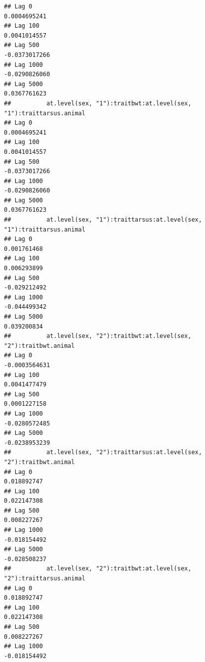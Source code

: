 \documentclass[
  12pt,
]{book}
\begin{document}
\begin{verbatim}
## Lag 0                                                         0.0004695241
## Lag 100                                                       0.0041014557
## Lag 500                                                      -0.0373017266
## Lag 1000                                                     -0.0290826060
## Lag 5000                                                      0.0367761623
##          at.level(sex, "1"):traitbwt:at.level(sex, "1"):traittarsus.animal
## Lag 0                                                         0.0004695241
## Lag 100                                                       0.0041014557
## Lag 500                                                      -0.0373017266
## Lag 1000                                                     -0.0290826060
## Lag 5000                                                      0.0367761623
##          at.level(sex, "1"):traittarsus:at.level(sex, "1"):traittarsus.animal
## Lag 0                                                             0.001761468
## Lag 100                                                           0.006293899
## Lag 500                                                          -0.029212492
## Lag 1000                                                         -0.044499342
## Lag 5000                                                          0.039200834
##          at.level(sex, "2"):traitbwt:at.level(sex, "2"):traitbwt.animal
## Lag 0                                                     -0.0003564631
## Lag 100                                                    0.0041477479
## Lag 500                                                    0.0001227158
## Lag 1000                                                  -0.0280572485
## Lag 5000                                                  -0.0238953239
##          at.level(sex, "2"):traittarsus:at.level(sex, "2"):traitbwt.animal
## Lag 0                                                          0.018892747
## Lag 100                                                        0.022147308
## Lag 500                                                        0.008227267
## Lag 1000                                                      -0.018154492
## Lag 5000                                                      -0.028508237
##          at.level(sex, "2"):traitbwt:at.level(sex, "2"):traittarsus.animal
## Lag 0                                                          0.018892747
## Lag 100                                                        0.022147308
## Lag 500                                                        0.008227267
## Lag 1000                                                      -0.018154492

\end{verbatim}
\end{document}
